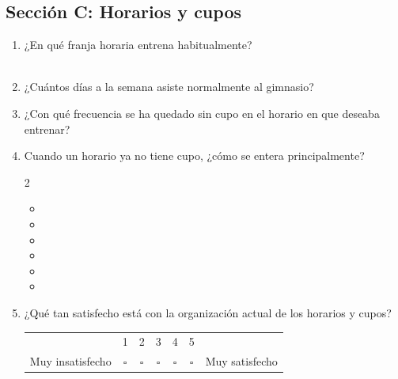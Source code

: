 \subsection*{Sección C: Horarios y cupos}
\begin{enumerate}[resume*=cuest]
  \item ¿En qué franja horaria entrena habitualmente?\\[0.3em]
  \quad {}\quad {}\\
  \quad {}

  \item ¿Cuántos días a la semana asiste normalmente al gimnasio?\\[0.3em]
  \quad {}\quad {}\quad {}\quad {}

  \item ¿Con qué frecuencia se ha quedado sin cupo en el horario en que deseaba entrenar?\\[0.3em]
  \quad {}\quad {}\quad {}\quad {}

  \item Cuando un horario ya no tiene cupo, ¿cómo se entera principalmente?
  \begin{multicols}{2}
  \begin{itemize}[label={}, leftmargin=0pt, itemsep=0pt]
    \item {}
    \item {}
    \item {}
    \item {}
    \item {}
    \item {}
  \end{itemize}
  \end{multicols}

  \item ¿Qué tan satisfecho está con la organización actual de los horarios y cupos?\\[0.3em]
  \begin{tabular}{@{}lccccc l@{}}
    & 1 & 2 & 3 & 4 & 5 & \\
    Muy insatisfecho & $\square$ & $\square$ & $\square$ & $\square$ & $\square$ & Muy satisfecho
  \end{tabular}
\end{enumerate}

